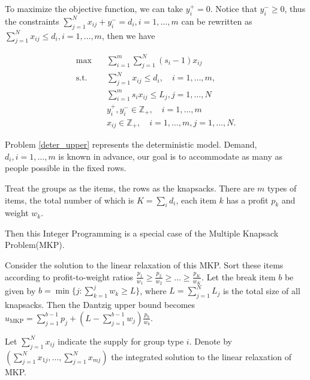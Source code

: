 To maximize the objective function, we can take $y_i^{+} = 0$. Notice that $y_{i}^{-} \geq 0$, thus the constraints $\sum_{j= 1}^{N} x_{ij} + y_{i}^{-} = d_{i}, i = 1,\ldots,m$ can be rewritten as $\sum_{j= 1}^{N} x_{ij} \leq d_{i}, i = 1,\ldots,m$, then we have

\begin{equation}\label{deter_upper}
  \begin{aligned}
  \max \quad & \sum_{i=1}^{m}  \sum_{j= 1}^{N} (s_i-1) x_{ij} \\
  \text {s.t.} \quad & \sum_{j= 1}^{N} x_{ij} \leq d_{i}, \quad i =1,\ldots,m, \\
  & \sum_{i=1}^{m} s_{i} x_{ij} \leq L_j, j =1,\ldots, N \\
  & y_{i}^{+}, y_{i}^{-} \in \mathbb{Z}_{+}, \quad i = 1,\ldots,m \\
  & x_{ij} \in \mathbb{Z}_{+}, \quad i=1,\ldots,m, j = 1,\ldots,N.
  \end{aligned}
\end{equation}

Problem \eqref{deter_upper} represents the deterministic model. Demand, $d_i, i = 1,\ldots,m$ is known in advance, our goal is to accommodate as many as people possible in the fixed rows.

Treat the groups as the items, the rows as the knapsacks. There are $m$ types of items, the total number of which is $K = \sum_{i} d_i$, each item $k$ has a profit $p_k$ and weight $w_k$. 


Then this Integer Programming is a special case of the Multiple Knapsack Problem(MKP). 


Consider the solution to the linear relaxation of this MKP. Sort these items according to profit-to-weight ratios $\frac{p_1}{w_1} \geq \frac{p_2}{w_2} \geq \ldots \geq \frac{p_K}{w_K}$.
Let the break item $b$ be given by $b=\min \{j: \sum_{k=1}^j w_k \geq L\}$, where $L = \sum_{j=1}^{N} L_j$ is the total size of all knapsacks. Then the Dantzig upper bound \cite{dantzig1957discrete} becomes 
$u_{\mathrm{MKP}}=\sum_{j=1}^{b-1} p_j+\left(L-\sum_{j=1}^{b-1} w_j\right) \frac{p_b}{w_b}$. 

Let $\sum_{j=1}^{N} x_{ij}$ indicate the supply for group type $i$. Denote by $(\sum_{j=1}^{N} x_{1j},\ldots, \sum_{j=1}^{N} x_{mj})$ the integrated solution to the linear relaxation of MKP.

